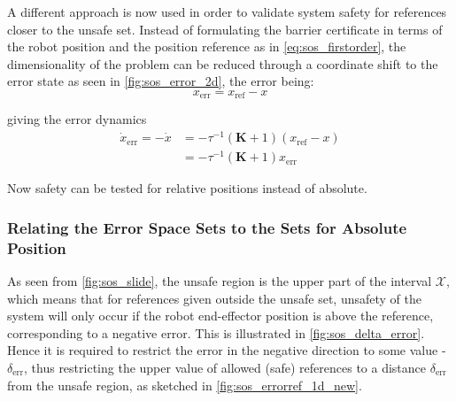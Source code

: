 A different approach is now used in order to validate system safety for references closer to the unsafe set. 
Instead of formulating the barrier certificate in terms of the robot position and the position reference as in \autoref{eq:sos_firstorder}, the dimensionality of the problem can be reduced  through a coordinate shift to the error state as seen in \autoref{fig:sos_error_2d}, the error being: %
\vspace{-3mm}
\begin{equation*}
x_\text{err}=x_\text{ref}-x
\end{equation*}

\vspace{-5mm}
giving the error dynamics
\vspace{-3mm}
\begin{align}
\dot{x}_\text{err} = -\dot{x} &= -\tau^{-1}(\mathbf{K}+1)(x_\text{ref}-x) \nonumber\\
&= -\tau^{-1}(\mathbf{K}+1)x_\text{err}
\end{align}

\vspace{-2mm}
Now safety can  be tested for relative positions instead of absolute.

\subsubsection{Relating the Error Space Sets to the Sets for Absolute Position}
 
\vspace{-2mm}
As seen from \autoref{fig:sos_slide}, the unsafe region is the upper part of the interval $\mathcal{X}$, which means that for references given outside the unsafe set, unsafety of the system will only occur if the robot end-effector position is above the reference, corresponding to a negative error. This is illustrated in \autoref{fig:sos_delta_error}.
Hence it is required to restrict the error in the negative direction to some value -$\delta_\text{err}$, thus restricting the upper value of allowed (safe) references to a distance $\delta_\text{err}$ from the unsafe region, as sketched in \autoref{fig:sos_errorref_1d_new}. %

